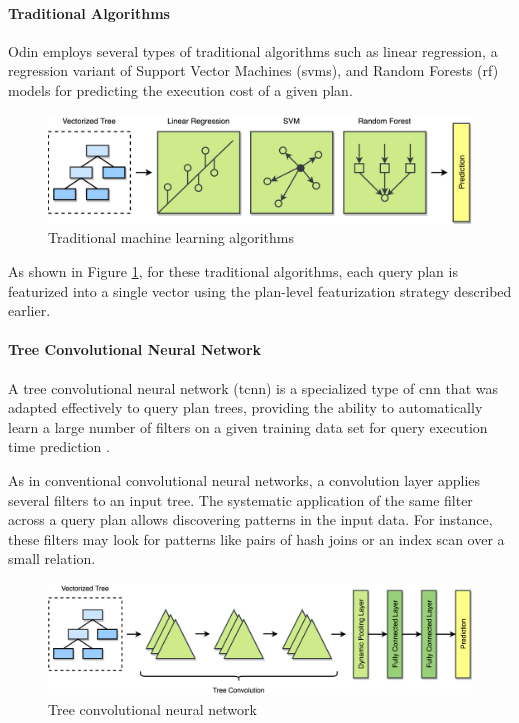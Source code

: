 \paragraph{Traditional Algorithms} 

Odin employs several types of traditional algorithms such as linear regression, a regression variant of Support Vector Machines (\gls{svms}), and Random Forests (\gls{rf}) models for predicting the execution cost of a given plan.

\begin{figure}[ht]
\centering
\includegraphics[width=\textwidth]{img/solution/traditional_algorithms.png}
\caption{Traditional machine learning algorithms}
\label{fig:traditional_algorithms}
\end{figure}

As shown in Figure \ref{fig:traditional_algorithms}, for these traditional algorithms, each query plan is featurized into a single vector using the plan-level featurization strategy described earlier.

\paragraph{Tree Convolutional Neural Network} 

A tree convolutional neural network (\gls{tcnn}) is a specialized type of \gls{cnn} that was adapted effectively to query plan trees, providing the ability to automatically learn a large number of filters on a given training data set for query execution time prediction \citep{Marcus2020}.

As in conventional convolutional neural networks, a convolution layer applies several filters to an input tree. The systematic application of the same filter across a query plan allows discovering patterns in the input data. For instance, these filters may look for patterns like pairs of hash joins or an index scan over a small relation.

\begin{figure}[ht]
\centering
\includegraphics[width=\textwidth]{img/solution/tree_convolutional_neural_network.png}
\caption{Tree convolutional neural network}
\label{fig:tree_convolutional_neural_network}
\end{figure}

